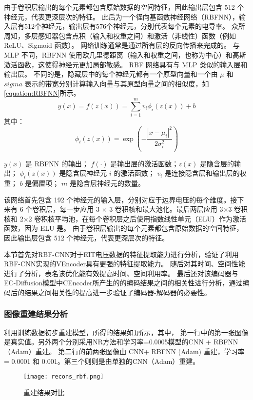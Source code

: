 由于卷积层输出的每个元素都包含原始数据的空间特征，因此输出层包含 512 个神经元，代表更深层次的特征。
此后为一个径向基函数神经网络（RBFNN），输入层有512个神经元，输出层有576个神经元，分别代表每个元素的电导率。
众所周知，多层感知器包含点积（输入和权重之间）和激活（非线性）函数（例如 ReLU、Sigmoid 函数）。
网络训练通常是通过所有层的反向传播来完成的。
与 MLP 不同，RBFNN 使用欧几里德距离（输入和权重之间，也称为中心）和高斯激活函数，这使得神经元更加局部敏感。 
RBF 网络具有与 MLP 类似的输入层和输出层。
不同的是，隐藏层中的每个神经元都有一个原型向量和一个由 $\mu$ 和 $sigma$ 表示的带宽分别计算输入向量与其原型向量之间的相似度，如\cref{equation:RBFNN}所示。
\begin{equation}
    \label{equation:RBFNN}
    y(x) = f(z(x)) = \sum_{i=1}^{m} v_i \phi_i(z(x)) + b
\end{equation}
其中：
\begin{equation}
    \phi_i(z(x)) = \exp\left(-\frac{|x - \mu_i|^2}{2\sigma_i^2}\right)
\end{equation}

$y(x)$ 是 RBFNN 的输出；
$f(\cdot)$ 是输出层的激活函数；$z(x)$ 是隐含层的输出；
$\phi_i(z(x))$ 是隐含层神经元 $i$ 的激活函数；
$v_i$ 是连接隐含层和输出层的权重；
$b$ 是偏置项；
$m$ 是隐含层神经元的数量。

该网络首先包含 192 个神经元的输入层，分别对应于边界电压的每个维度。接下来有 6 个卷积层，每一步应用 3 × 3 卷积核和最大池化。最后两层应用 3×3 卷积核和 2×2 卷积核平均池，在每个卷积层之后使用指数线性单元（ELU）作为激活函数，因为 ELU 是。
由于卷积层输出的每个元素都包含原始数据的空间特征，因此输出层包含 512 个神经元，代表更深层次的特征。


本节首先对RBF-CNN对于EIT电压数据的特征提取能力进行分析，验证了利用RBF-CNN实现的VEncoder具有更强的特征提取能力。
随后对其时间、空间性能进行了分析，表名该优化能有效提高时间、空间利用率。
最后还对该编码器与EC-Diffusion模型中CEncoder所产生的的编码结果之间的相关性进行分析，通过编码后的结果之间相关性的提高进一步验证了编码器-解码器的必要性。
\subsubsection{图像重建结果分析}
利用训练数据初步重建模型，所得的结果如\cref{figure:recons_rbf}所示，其中，
第一行中的第一张图像是真实值。另外两个分别采用NR方法和学习率=0.0005模型的CNN + RBFNN（Adam）重建。
第二行的前两张图像由 CNN+ RBFNN (Adam) 重建，学习率 = 0.0001 和 0.001。第三个则则是由单独的CNN（Adam）重建。
\begin{figure}[H]
    \centering
    
    \texttt{[image: recons\_rbf.png]}
    \label{figure:recons_rbf}
    \caption{重建结果对比}
\end{figure}

